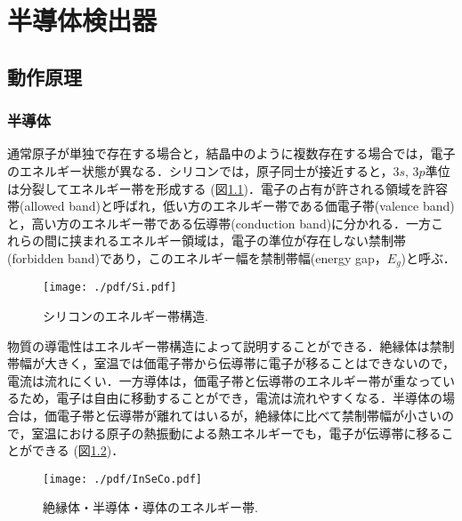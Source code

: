 \chapter{半導体検出器}
\label{chap:semicon}
\section{動作原理}
\subsection{半導体}
通常原子が単独で存在する場合と，結晶中のように複数存在する場合では，電子のエネルギー状態が異なる．シリコンでは，原子同士が接近すると，$3s$, $3p$準位は分裂してエネルギー帯を形成する (図\ref{fig:Si})．電子の占有が許される領域を許容帯(allowed band)と呼ばれ，低い方のエネルギー帯である価電子帯(valence band)と，高い方のエネルギー帯である伝導帯(conduction band)に分かれる．一方これらの間に挟まれるエネルギー領域は，電子の準位が存在しない禁制帯(forbidden band)であり，このエネルギー幅を禁制帯幅(energy gap，$E_{g}$)と呼ぶ．\par
\begin{figure}[h]
	\centering
	\texttt{[image: ./pdf/Si.pdf]}
	\caption{シリコンのエネルギー帯構造.}
	\label{fig:Si}
\end{figure}
物質の導電性はエネルギー帯構造によって説明することができる．絶縁体は禁制帯幅が大きく，室温では価電子帯から伝導帯に電子が移ることはできないので，電流は流れにくい．一方導体は，価電子帯と伝導帯のエネルギー帯が重なっているため，電子は自由に移動することができ，電流は流れやすくなる．半導体の場合は，価電子帯と伝導帯が離れてはいるが，絶縁体に比べて禁制帯幅が小さいので，室温における原子の熱振動による熱エネルギーでも，電子が伝導帯に移ることができる (図\ref{fig:InSeCo})．\par
\begin{figure}[h]
	\centering
	\texttt{[image: ./pdf/InSeCo.pdf]}
	\caption{絶縁体・半導体・導体のエネルギー帯.}
	\label{fig:InSeCo}
\end{figure}
